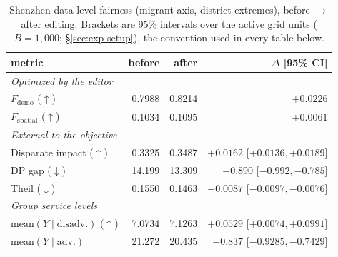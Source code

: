 \begin{table}[t]
\centering
\caption{Shenzhen data-level fairness (migrant axis, district extremes), before
$\to$ after editing. Brackets are 95\% intervals over the active grid units
($B = 1{,}000$; \S\ref{sec:exp-setup}), the convention used in every table below.}
\label{tab:external-sz}
\footnotesize
\setlength{\tabcolsep}{4pt}
\begin{tabular}{lrrr}
\toprule
metric & before & after & $\Delta$ [95\% CI] \\
\midrule
\multicolumn{4}{l}{\emph{Optimized by the editor}}\\
$F_{\mathrm{demo}}$ ($\uparrow$) & 0.7988 & 0.8214 & $+0.0226$ \\
$F_{\mathrm{spatial}}$ ($\uparrow$) & 0.1034 & 0.1095 & $+0.0061$ \\
\midrule
\multicolumn{4}{l}{\emph{External to the objective}}\\
Disparate impact ($\uparrow$) & 0.3325 & 0.3487 & $+0.0162$ [$+0.0136, +0.0189$] \\
DP gap ($\downarrow$) & 14.199 & 13.309 & $-0.890$ [$-0.992, -0.785$] \\
Theil ($\downarrow$) & 0.1550 & 0.1463 & $-0.0087$ [$-0.0097, -0.0076$] \\
\midrule
\multicolumn{4}{l}{\emph{Group service levels}}\\
$\mathrm{mean}(Y \mid \mathrm{disadv.})$ ($\uparrow$) & 7.0734 & 7.1263 & $+0.0529$ [$+0.0074, +0.0991$] \\
$\mathrm{mean}(Y \mid \mathrm{adv.})$ & 21.272 & 20.435 & $-0.837$ [$-0.9285, -0.7429$] \\
\bottomrule
\end{tabular}
\end{table}
